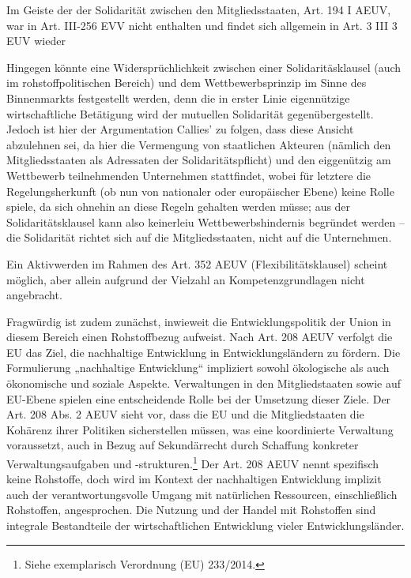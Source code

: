 \documentclass[12pt,a4paper,oneside]{book} %
\begin{document}
Im Geiste der der Solidarität zwischen den Mitgliedsstaaten, Art. 194 I AEUV, war in Art. III-256 EVV nicht enthalten und findet sich allgemein in Art. 3 III 3 EUV wieder
	
Hingegen könnte eine Widersprüchlichkeit zwischen einer Solidaritäsklausel (auch im rohstoffpolitischen Bereich) und dem Wettbewerbsprinzip im Sinne des Binnenmarkts festgestellt werden, denn die in erster Linie eigennützige wirtschaftliche Betätigung wird der mutuellen Solidarität gegenübergestellt.\autocite{Ehricke/Hackländer: ZEuS 2008, S. 579, 595f.} Jedoch ist hier der Argumentation Callies' zu folgen, dass diese Ansicht abzulehnen sei, da hier die Vermengung von staatlichen Akteuren (nämlich den Mitgliedsstaaten als Adressaten der Solidaritätspflicht) und den eiggenützig am Wettbewerb teilnehmenden Unternehmen stattfindet, wobei für letztere die Regelungsherkunft (ob nun von nationaler oder europäischer Ebene) keine Rolle spiele, da sich ohnehin an diese Regeln gehalten werden müsse; aus der Solidaritätsklausel kann also keinerleiu Wettbewerbshindernis begründet werden -- die Solidarität richtet sich auf die Mitgliedsstaaten, nicht auf die Unternehmen.
	
Ein Aktivwerden im Rahmen des Art. 352 AEUV (\glqq Flexibilitätsklausel\grqq) scheint möglich, aber allein aufgrund der Vielzahl an Kompetenzgrundlagen nicht angebracht.
	
Fragwürdig ist zudem zunächst, inwieweit die Entwicklungspolitik der Union in diesem Bereich einen Rohstoffbezug aufweist. Nach Art. 208 AEUV verfolgt die EU das Ziel, die nachhaltige Entwicklung in Entwicklungsländern zu fördern. Die Formulierung „nachhaltige Entwicklung“ impliziert sowohl ökologische als auch ökonomische und soziale Aspekte. Verwaltungen in den Mitgliedstaaten sowie auf EU-Ebene spielen eine entscheidende Rolle bei der Umsetzung dieser Ziele. Der Art. 208 Abs. 2 AEUV sieht vor, dass die EU und die Mitgliedstaaten die Kohärenz ihrer Politiken sicherstellen müssen, was eine koordinierte Verwaltung voraussetzt, auch in Bezug auf Sekundärrecht durch Schaffung konkreter Verwaltungsaufgaben und -strukturen.\footnote{Siehe exemplarisch Verordnung (EU) 233/2014.} Der Art. 208 AEUV nennt spezifisch keine Rohstoffe, doch wird im Kontext der nachhaltigen Entwicklung implizit auch der verantwortungsvolle Umgang mit natürlichen Ressourcen, einschließlich Rohstoffen, angesprochen. Die Nutzung und der Handel mit Rohstoffen sind integrale Bestandteile der wirtschaftlichen Entwicklung vieler Entwicklungsländer.
	
\end{document}
